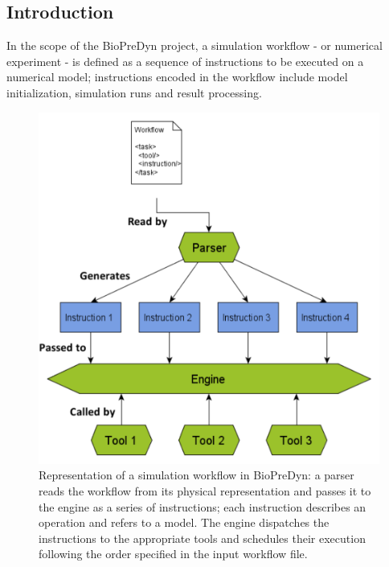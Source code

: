 \documentclass[portrait,a1,usenames,dvipsnames]{sciposter}
\begin{document}
\begin{multicols}{2}

\section{Introduction}
In the scope of the BioPreDyn project, a simulation workflow - or
numerical experiment - is defined as a sequence of instructions to be executed
on a numerical model; instructions encoded in the workflow include model
initialization, simulation runs and result processing.

\begin{figure}
\begin{minipage}[c]{0.5\textwidth}
\includegraphics[width=\textwidth]{proposal_complete.pdf}
\end{minipage}\hfill
\begin{minipage}[c]{0.45\textwidth}
\caption{Representation of a simulation workflow in BioPreDyn: a parser reads
the workflow from its physical representation and passes it to the engine as a
series of instructions; each instruction describes an operation and refers to
a model. The engine dispatches the instructions to the appropriate tools and
schedules their execution following the order specified in the input workflow
file.}
\end{minipage}
\end{figure}


\end{multicols}
\end{document}
